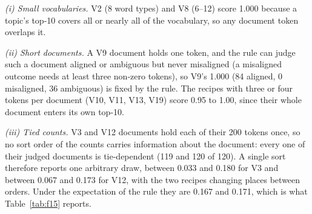 \documentclass[journal,a4paper,10pt]{IEEEtran}
\begin{document}
\emph{(i) Small vocabularies.} V2 (8 word types) and V8 (6--12) score
1.000 because a topic's top-10 covers all or nearly all of the
vocabulary, so any document token overlaps it.

\emph{(ii) Short documents.} A V9 document holds one token, and the
rule can judge such a document aligned or ambiguous but never
misaligned (a misaligned outcome needs at least three non-zero tokens),
so V9's 1.000 (84 aligned, 0 misaligned, 36 ambiguous) is fixed by the
rule. The recipes with three or four tokens per document (V10, V11,
V13, V19) score 0.95 to 1.00, since their whole document enters its own
top-10.

\emph{(iii) Tied counts.} V3 and V12 documents hold each of their 200
tokens once, so no sort order of the counts carries information about
the document: every one of their judged documents is tie-dependent (119
and 120 of 120). A single sort therefore reports one arbitrary draw,
between 0.033 and 0.180 for V3 and between 0.067 and 0.173 for V12,
with the two recipes changing places between orders. Under the
expectation of the rule they are 0.167 and 0.171, which is what
Table~\ref{tab:f15} reports.
\end{document}
